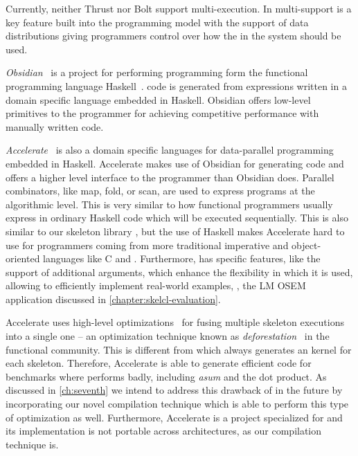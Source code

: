 Currently, neither Thrust nor Bolt support multi-\GPU execution.
In \SkelCL multi-\GPU support is a key feature built into the programming model with the support of data distributions giving programmers control over how the \GPUs in the system should be used.

\bigskip

\emph{Obsidian}~\cite{SvenssonSC08,SvenssonCS10} is a project for performing \GPU programming form the functional programming language Haskell~\cite{HudakPWBFFGHHJKNPP92}.
\GPU code is generated from expressions written in a domain specific language embedded in Haskell.
Obsidian offers low-level primitives to the programmer for achieving competitive performance with manually written \CUDA code.

\bigskip

\emph{Accelerate}~\cite{ChakravartyKLMG11,McDonellCKL13} is also a domain specific languages for data-parallel programming embedded in Haskell.
Accelerate makes use of Obsidian for generating \GPU code and offers a higher level interface to the programmer than Obsidian does.
Parallel combinators, like map, fold, or scan, are used to express programs at the algorithmic level.
This is very similar to how functional programmers usually express in ordinary Haskell code which will be executed sequentially.
This is also similar to our skeleton library \SkelCL, but the use of Haskell makes Accelerate hard to use for programmers coming from more traditional imperative and object-oriented languages like C and \Cpp.
Furthermore, \SkelCL has specific features, like the support of additional arguments, which enhance the flexibility in which it is used, allowing to efficiently implement real-world examples, \eg, the LM OSEM application discussed in \autoref{chapter:skelcl-evaluation}.

Accelerate uses high-level optimizations~\cite{McDonellCKL13} for fusing multiple skeleton executions into a single one -- an optimization technique known as \emph{deforestation}~\cite{Wadler90} in the functional community.
This is different from \SkelCL which always generates an \OpenCL kernel for each skeleton.
Therefore, Accelerate is able to generate efficient code for benchmarks where \SkelCL performs badly, including \emph{asum} and the dot product.
As discussed in \autoref{ch:seventh} we intend to address this drawback of \SkelCL in the future by incorporating our novel compilation technique which is able to perform this type of optimization as well.
Furthermore, Accelerate is a project specialized for \GPUs and its implementation is not portable across architectures, as our compilation technique is.

